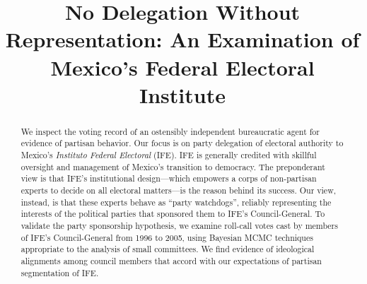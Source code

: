 \documentclass[12 pt]{article}
\begin{document}
\singlespacing
\title{No Delegation Without Representation: An Examination of Mexico's Federal Electoral Institute}
\date{}
\maketitle
\begin{abstract}
We inspect the voting record of an ostensibly independent bureaucratic agent for evidence of partisan behavior.  Our focus is on party delegation of electoral authority to Mexico's \emph{Instituto Federal Electoral} (IFE).  IFE is generally credited with skillful oversight and management of Mexico's transition to democracy.  The preponderant view is that IFE's institutional design---which empowers a corps of non-partisan experts to decide on all electoral matters---is the reason behind its success.  Our view, instead, is that these experts behave as ``party watchdogs'', reliably representing the interests of the political parties that sponsored them to IFE's Council-General.  To validate the party sponsorship hypothesis, we examine roll-call votes cast by members of IFE's Council-General from 1996 to 2005, using Bayesian MCMC techniques appropriate to the analysis of small committees.  We find evidence of ideological alignments among council members that accord with our expectations of partisan segmentation of IFE.\\
%
\end{abstract}
\vskip 4.5cm
\pagebreak
\doublespace
\end{document}
